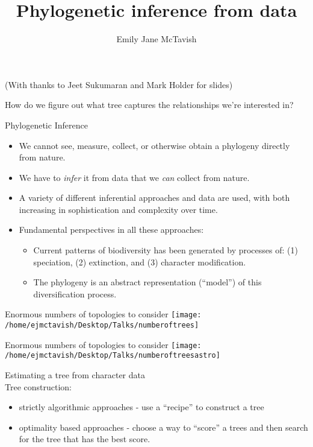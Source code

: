 \documentclass{beamer}
\title[*]{Phylogenetic inference from data}
\author[*]{Emily Jane McTavish}
\institute[*]{
Life and Environmental Sciences\\
University of California, Merced\\
\texttt{ejmctavish@ucmerced.edu, twitter:snacktavish}\\
}
\date{}
\begin{document}
\begin{frame}
\titlepage
(With thanks to Jeet Sukumaran and Mark Holder for slides) 
\end{frame}




\begin{frame}
\Large
How do we figure out what tree captures the relationships we're interested in?
\end{frame}

\begin{frame}{Phylogenetic Inference}
    \begin{itemize}[<+->]
        \item   We cannot see, measure, collect, or otherwise obtain a phylogeny directly from nature.
        \item   We have to \textit{infer} it from data that we \textit{can} collect from nature.
        \item   A variety of different inferential approaches and data are used, with both increasing in sophistication and complexity over time.
        \item   Fundamental perspectives in all these approaches:
            \begin{itemize}
                \item   Current patterns of biodiversity has been generated by processes of: (1) speciation, (2) extinction, and (3) character modification.
                \item   The phylogeny is an abstract representation (``model'') of this diversification process.
            \end{itemize}
    \end{itemize}
\end{frame}



\begin{frame}
\Large{Enormous numbers of topologies to consider}
\texttt{[image: /home/ejmctavish/Desktop/Talks/numberoftrees]}
\end{frame}

\begin{frame}
\Large{Enormous numbers of topologies to consider}
\texttt{[image: /home/ejmctavish/Desktop/Talks/numberoftreesastro]}
\end{frame}

\begin{frame}
Estimating a tree from character data\\
Tree construction:
\begin{itemize}
 \item strictly algorithmic approaches - use a “recipe” to construct a tree
  \item optimality based approaches - choose a way to “score” a trees and then search for the tree that has the best score.
\end{itemize}

\end{frame}
\end{document}
